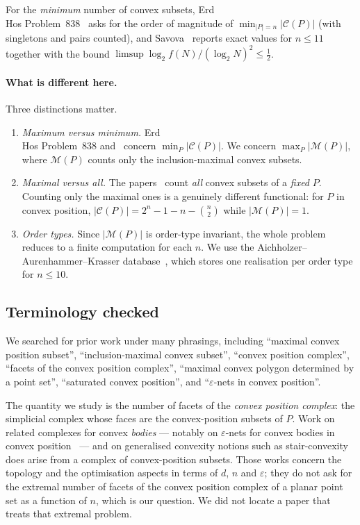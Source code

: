 \documentclass[11pt,a4paper]{article}
\theoremstyle{definition}
\newcommand{\M}{\mathcal{M}}
\newcommand{\CP}{\mathcal{C}}
\begin{document}
For the \emph{minimum} number of convex subsets, Erd{\\H{o}}s Problem~838~\cite{erdos838}
asks for the order of magnitude of $\min_{|P|=n}|\CP(P)|$ (with singletons and pairs
counted), and Savova~\cite{savova2026} reports exact values for $n\le 11$ together
with the bound $\limsup\log_2 f(N)/(\log_2 N)^2\le \tfrac12$.

\paragraph{What is different here.}

Three distinctions matter.

\begin{enumerate}[leftmargin=*]
\item \emph{Maximum versus minimum.} Erd{\\H{o}}s Problem~838 and~\cite{savova2026}
  concern $\min_P|\CP(P)|$.  We concern $\max_P|\M(P)|$, where $\M(P)$ counts only
  the inclusion-maximal convex subsets.
\item \emph{Maximal versus all.} The papers~\cite{rote91,rote92,mitchell95} count
  \emph{all} convex subsets of a \emph{fixed} $P$.  Counting only the maximal ones
  is a genuinely different functional: for $P$ in convex position,
  $|\CP(P)|=2^n-1-n-\binom n2$ while $|\M(P)|=1$.
\item \emph{Order types.} Since $|\M(P)|$ is order-type invariant, the whole problem
  reduces to a finite computation for each $n$.  We use the
  Aichholzer--Aurenhammer--Krasser database~\cite{aak2002,aak2001,aak2007}, which
  stores one realisation per order type for $n\le 10$.
\end{enumerate}

\subsection{Terminology checked}

We searched for prior work under many phrasings, including
``maximal convex position subset'', ``inclusion-maximal convex subset'',
``convex position complex'', ``facets of the convex position complex'',
``maximal convex polygon determined by a point set'', ``saturated convex
position'', and ``$\varepsilon$-nets in convex position''.

The quantity we study is the number of facets of the \emph{convex position
complex}: the simplicial complex whose faces are the convex-position subsets of
$P$.  Work on related complexes for convex \emph{bodies} --- notably on
$\varepsilon$-nets for convex bodies in convex position~\cite{hmp2020} --- and on
generalised convexity notions such as stair-convexity~\cite{bukhmnk11} does arise
from a complex of convex-position subsets.  Those works concern the topology and
the optimisation aspects in terms of $d$, $n$ and $\varepsilon$; they do not ask
for the extremal number of facets of the convex position complex of a planar point
set as a function of $n$, which is our question.  We did not locate a paper that
treats that extremal problem.
\end{document}
